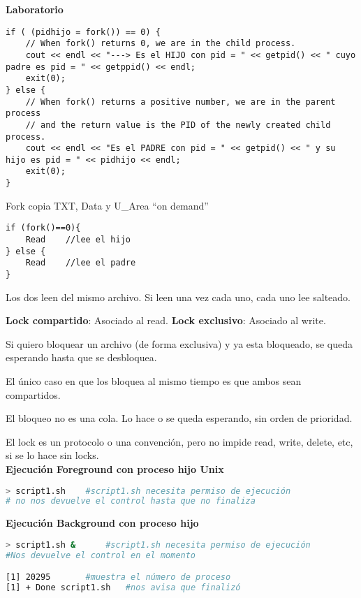 \documentclass[a4paper, twoside]{article}
\begin{document}
\textbf{Laboratorio}

\begin{lstlisting}
if ( (pidhijo = fork()) == 0) {
	// When fork() returns 0, we are in the child process.
	cout << endl << "---> Es el HIJO con pid = " << getpid() << " cuyo padre es pid = " << getppid() << endl;
	exit(0);
} else {
	// When fork() returns a positive number, we are in the parent process
	// and the return value is the PID of the newly created child process.
	cout << endl << "Es el PADRE con pid = " << getpid() << " y su hijo es pid = " << pidhijo << endl;
	exit(0);
}
\end{lstlisting}

Fork copia TXT, Data y U\_Area “on demand”

\begin{lstlisting}
if (fork()==0){
	Read	//lee el hijo
} else {
	Read	//lee el padre
}
\end{lstlisting}

Los dos leen del mismo archivo. Si leen una vez cada uno, cada uno lee salteado.

\textbf{Lock compartido}: Asociado al read.
\textbf{Lock exclusivo}: Asociado al write.

Si quiero bloquear un archivo (de forma exclusiva) y ya esta bloqueado,
se queda esperando hasta que se desbloquea.

El único caso en que los bloquea al mismo tiempo es que ambos sean compartidos.

El bloqueo no es una cola. Lo hace o se queda esperando, sin orden de prioridad.

El lock es un protocolo o una convención, pero no impide read, write, delete,
etc, si se lo hace sin locks.\\

\textbf{Ejecución Foreground con proceso hijo Unix}
\begin{lstlisting}[language=sh]
> script1.sh 	#script1.sh necesita permiso de ejecución
# no nos devuelve el control hasta que no finaliza
\end{lstlisting}

\textbf{Ejecución Background con proceso hijo}
\begin{lstlisting}[language=sh]
> script1.sh & 		#script1.sh necesita permiso de ejecución
#Nos devuelve el control en el momento

[1] 20295 		#muestra el número de proceso
[1] + Done script1.sh 	#nos avisa que finalizó
\end{lstlisting}
\end{document}
